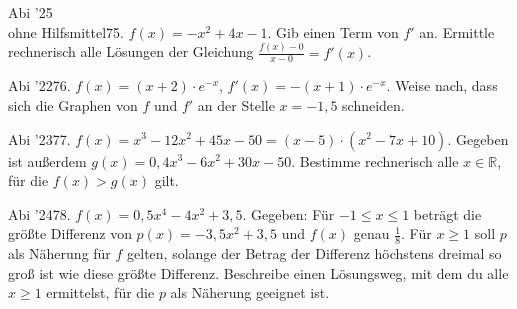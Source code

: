 \documentclass[11pt]{article}
\begin{document}
\pfgruppe{}
\begin{pfaufg}{Abi ’25\\ohne Hilfsmittel}{75.}{}
$f(x) = -x^2 + 4x - 1$. Gib einen Term von $f'$ an. Ermittle rechnerisch alle Lösungen der Gleichung $\tfrac{f(x) - 0}{x - 0} = f'(x)$.
\par\smallskip\noindent {}\par
{}
\end{pfaufg}
\pfgruppe{}
\begin{pfaufg}{Abi ’22}{76.}{}
$f(x) = (x + 2)\cdot e^{-x}$, $f'(x) = -(x + 1)\cdot e^{-x}$. Weise nach, dass sich die Graphen von $f$ und $f'$ an der Stelle $x = -1{,}5$ schneiden.
\end{pfaufg}
\pfgruppe{}
\begin{pfaufg}{Abi ’23}{77.}{}
$f(x) = x^3 - 12x^2 + 45x - 50 = (x - 5)\cdot(x^2 - 7x + 10)$. Gegeben ist außerdem $g(x) = 0{,}4x^3 - 6x^2 + 30x - 50$. Bestimme rechnerisch alle $x \in \mathbb{R}$, für die $f(x) > g(x)$ gilt.
\end{pfaufg}
\pfgruppe{}
\begin{pfaufg}{Abi ’24}{78.}{}
$f(x) = 0{,}5x^4 - 4x^2 + 3{,}5$. Gegeben: Für $-1 \le x \le 1$ beträgt die größte Differenz von $p(x) = -3{,}5x^2 + 3{,}5$ und $f(x)$ genau $\tfrac{1}{8}$. Für $x \ge 1$ soll $p$ als Näherung für $f$ gelten, solange der Betrag der Differenz höchstens dreimal so groß ist wie diese größte Differenz. Beschreibe einen Lösungsweg, mit dem du alle $x \ge 1$ ermittelst, für die $p$ als Näherung geeignet ist.
\end{pfaufg}
\pfgruppe{}
\end{document}
